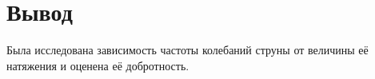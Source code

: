 \section{Вывод}
Была исследована зависимость частоты колебаний струны от величины её натяжения и
оценена её добротность.